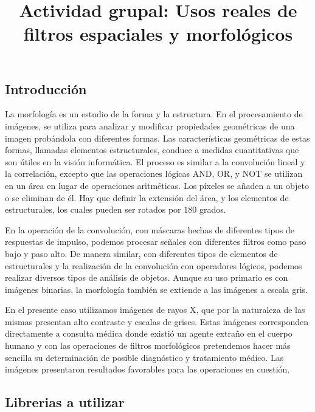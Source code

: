 \documentclass[11pt,a4paper,table]{article}
\title{Actividad grupal: Usos reales de filtros espaciales y morfológicos}
\makeatletter
\let\newtitle\@title
\makeatother
\begin{document}
    
    
    
    
    \hypertarget{actividad-grupal-usos-reales-de-filtros-espaciales-y-morfoluxf3gicos}{%
\textcolor{UnirDark}{\Large\bfseries\newtitle}\label{actividad-grupal-usos-reales-de-filtros-espaciales-y-morfoluxf3gicos}}

\hypertarget{introducciuxf3n}{%
\subsection*{Introducción}\label{introducciuxf3n}}

La morfología es un estudio de la forma y la estructura. En el
procesamiento de imágenes, se utiliza para analizar y modificar
propiedades geométricas de una imagen probándola con diferentes formas.
Las características geométricas de estas formas, llamadas elementos
estructurales, conduce a medidas cuantitativas que son útiles en la
visión informática. El proceso es similar a la convolución lineal y la
correlación, excepto que las operaciones lógicas AND, OR, y NOT se
utilizan en un área en lugar de operaciones aritméticas. Los píxeles se
añaden a un objeto o se eliminan de él. Hay que definir la extensión del
área, y los elementos de estructurales, los cuales pueden ser rotados
por 180 grados.\cite{Sundararajan_2017}

En la operación de la convolución, con máscaras hechas de diferentes
tipos de respuestas de impulso, podemos procesar señales con diferentes
filtros como paso bajo y paso alto. De manera similar, con diferentes
tipos de elementos de estructurales y la realización de la convolución
con operadores lógicos, podemos realizar diversos tipos de análisis de
objetos. Aunque su uso primario es con imágenes binarias, la morfología
también se extiende a las imágenes a escala gris.\cite{Sundararajan_2017}

En el presente caso utilizamos imágenes de rayos X, que por la
naturaleza de las mismas presentan alto contraste y escalas de grises.
Estas imágenes corresponden directamente a consulta médica donde existió
un agente extraño en el cuerpo humano y con las operaciones de filtros
morfológicos pretendemos hacer más sencilla su determinación de posible
diagnóstico y tratamiento médico. Las imágenes presentaron resultados
favorables para las operaciones en cuestión.

    \hypertarget{librerias-a-utilizar}{%
\subsection*{Librerias a utilizar}\label{librerias-a-utilizar}}
\end{document}
